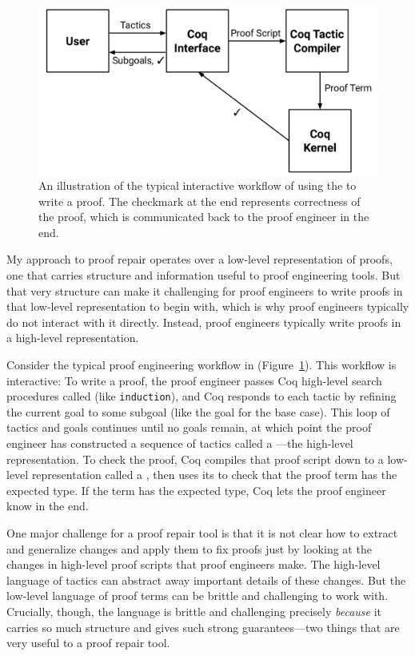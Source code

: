 \begin{figure}
\begin{center}
\includegraphics[scale=0.32]{Development}
\end{center}
\caption{An illustration of the typical interactive workflow of using the   to write a proof. The checkmark at the end
represents correctness of the proof, which is communicated back to the proof engineer in the end.}
\label{fig:workflow}
\end{figure}

My approach to proof repair operates over a low-level representation of proofs,
one that carries structure and information useful to proof engineering tools.
But that very structure can make it challenging for proof engineers to write proofs in that low-level representation
to begin with, which is why proof engineers typically do not interact with it directly.
Instead, proof engineers typically write proofs in a high-level representation.

Consider the typical proof engineering workflow in  (Figure~\ref{fig:workflow}).
This workflow is interactive:
To write a proof, the proof engineer passes Coq high-level search procedures called  (like \lstinline{induction}), and Coq responds to each tactic
by refining the current goal to some subgoal (like the goal for the base case). This loop of tactics and goals 
continues until no goals remain, at which point the proof engineer has constructed a sequence of tactics called a ---the
high-level representation.
To check the proof, Coq compiles that proof script down to a low-level representation called a ,
then uses its  to check that the proof term has the expected type.
If the term has the expected type, Coq lets the proof engineer know in the end.

One major challenge for a proof repair tool is that it is not clear how to extract and generalize changes and apply
them to fix proofs just by looking at the changes in high-level proof scripts that proof engineers make.
The high-level language of tactics can abstract away important details of these changes.
But the low-level language of proof terms can be brittle and challenging to work with.
Crucially, though, the language is brittle and challenging precisely \textit{because}
it carries so much structure and gives such strong guarantees---two things that are very useful to a proof repair tool.

